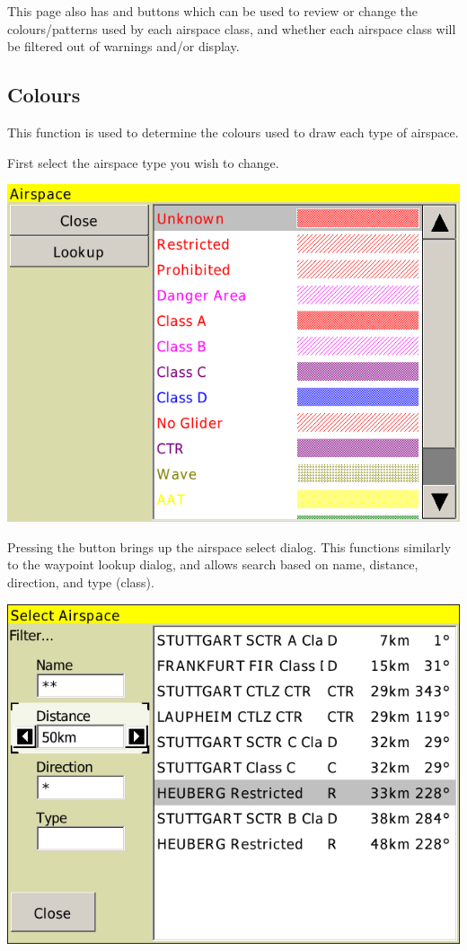 \documentclass[a4paper,12pt]{refrep}
\begin{document}
This page also has  and  buttons which
can be used to review or change the colours/patterns used by each
airspace class, and whether each airspace class will be filtered out
of warnings and/or display.  

\subsection*{Colours}
This function is used to determine the colours used to draw each type of
airspace.

First select the airspace type you wish to change.

\begin{center}
\includegraphics[angle=0,width=0.8\linewidth,keepaspectratio='true']{figures/config-airspacecolors.png}
\end{center}

Pressing the  button brings up the airspace select dialog.
This functions similarly to the waypoint lookup dialog, and allows
search based on name, distance, direction, and type (class).  

\begin{center}
\includegraphics[angle=0,width=0.8\linewidth,keepaspectratio='true']{figures/airspacelookup.png}
\end{center}
\end{document}
